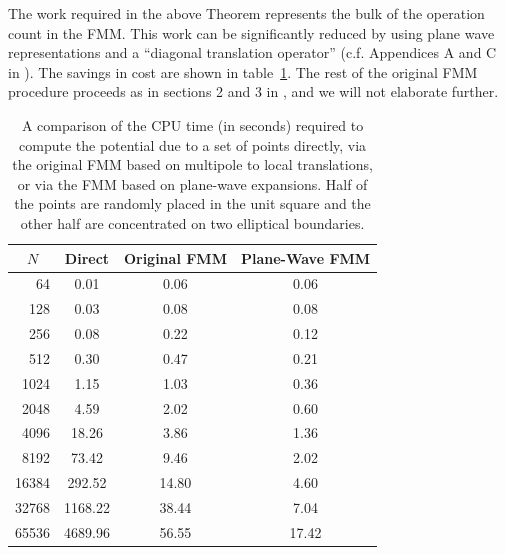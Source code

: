 \documentclass[preprint,12pt]{elsarticle}
\newcommand{\tabr}[1]{table~\ref{#1}}
\begin{document}
The work required in the above Theorem represents the bulk of the operation count in the FMM. 
This work can be significantly reduced by using plane wave representations and a ``diagonal translation operator'' (c.f. Appendices A and C in \cite{modified:helmholtz}). 
The savings in cost are shown in \tabr{table1}.
The rest of the original FMM procedure proceeds as in sections 2 and 3 in \cite{modified:helmholtz}, and we will not elaborate further.  

\begin{table}[htbp]
\begin{center}
\begin{tabular*}{\textwidth}{@{\extracolsep{\fill}}rccc}     \hline
\multicolumn{1}{c}{$N$} & Direct & Original FMM & Plane-Wave FMM  \\ \hline
64    &  0.01 & 0.06             & 0.06 \\  
128   & 0.03 & 0.08             & 0.08 \\  
256   & 0.08 & 0.22             &  0.12 \\  
512   & 0.30 & 0.47             & 0.21 \\  
1024   & 1.15 & 1.03           & 0.36 \\ 
2048   & 4.59 & 2.02           & 0.60 \\ 
4096   & 18.26 & 3.86         & 1.36 \\ 
8192   & 73.42 & 9.46         & 2.02 \\ 
16384   & 292.52 & 14.80   & 4.60 \\ 
32768   & 1168.22 & 38.44 & 7.04 \\ 
65536  & 4689.96 & 56.55  &  17.42   \\ \hline
\end{tabular*}
\end{center}
\caption{A comparison of the CPU time (in seconds) required to compute the potential due to a set of points directly, via the original FMM based on multipole to local translations, or via the FMM based on plane-wave expansions.
Half of the points are randomly placed in the unit square 
and the other half are concentrated on two elliptical boundaries.
\label{table1} }
\end{table}
\end{document}
